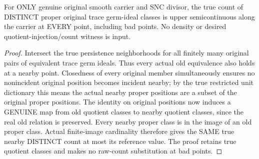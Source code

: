 \begin{theorem}
\label{hir:sharp-original-distinct-proper-trace-count-usc-all-points}
\leanok
For ONLY genuine original smooth carrier and SNC divisor, the true count of
DISTINCT proper original trace germ-ideal classes is upper semicontinuous along
the carrier at EVERY point, including bad points. No density or desired
quotient-injection/count witness is input.
\end{theorem}
\begin{proof}
Intersect the true persistence neighborhoods for all finitely many original
pairs of equivalent trace germ ideals. Thus every actual old equivalence also
holds at a nearby point. Closedness of every original member simultaneously
ensures no nonincident original position becomes incident nearby; by the true
restricted unit dictionary this means the actual nearby proper positions are
a subset of the original proper positions. The identity on original positions
now induces a GENUINE map from old quotient classes to nearby quotient classes,
since the real old relation is preserved. Every nearby proper class is in the
image of an old proper class. Actual finite-image cardinality therefore gives
the SAME true nearby DISTINCT count at most its reference value. The proof
retains true quotient classes and makes no raw-count substitution at bad points.
\end{proof}

